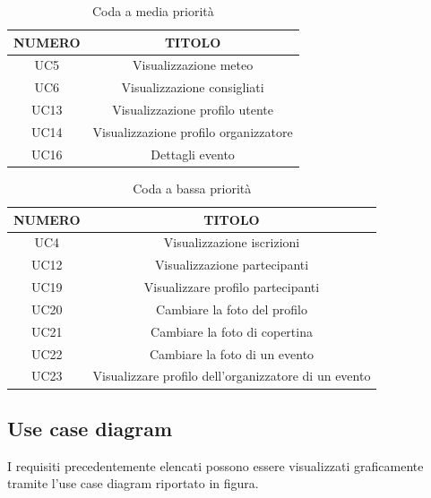 \begin{table}
\begin{center}
\begin{tabular}{ |c|c|}
 \hline
 \textbf{NUMERO}& \textbf{TITOLO} \\ \hline
 UC5& Visualizzazione meteo\\ \hline
 UC6& Visualizzazione consigliati\\ \hline
 UC13&Visualizzazione profilo utente\\ \hline
 UC14&Visualizzazione profilo organizzatore\\ \hline
 UC16& Dettagli evento\\ \hline
\end{tabular}
  \caption{Coda a media priorità}
  \label{tab: media-priorità}
\end{center}
\end{table}

\begin{table}
\begin{center}
\begin{tabular}{ |c|c|}
 \hline
 \textbf{NUMERO}& \textbf{TITOLO} \\ \hline
 UC4& Visualizzazione iscrizioni\\ \hline
 UC12& Visualizzazione partecipanti\\ \hline
 UC19& Visualizzare profilo partecipanti\\ \hline
 UC20& Cambiare la foto del profilo\\ \hline
 UC21& Cambiare la foto di copertina\\ \hline
 UC22& Cambiare la foto di un evento\\ \hline
 UC23& Visualizzare profilo dell'organizzatore di un evento\\ \hline
\end{tabular}
  \caption{Coda a bassa priorità}
  \label{tab: bassa-priorità}
\end{center}
\end{table}

\clearpage
\subsection{Use case diagram}
I requisiti precedentemente elencati possono essere visualizzati graficamente tramite l'use case diagram riportato in figura.

